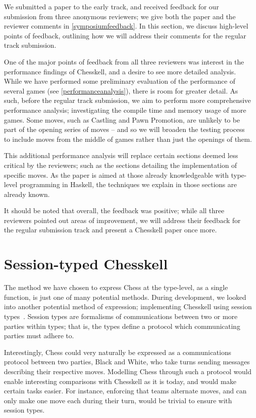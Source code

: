 We submitted a paper to the early track, and received feedback for our submission from three anonymous reviewers; we give both the paper and the reviewer comments in \cref{symposiumfeedback}. In this section, we discuss high-level points of feedback, outlining how we will address their comments for the regular track submission.

One of the major points of feedback from all three reviewers was interest in the performance findings of Chesskell, and a desire to see more detailed analysis. While we have performed some preliminary evaluation of the performance of several games (see \cref{performanceanalysis}), there is room for greater detail. As such, before the regular track submission, we aim to perform more comprehensive performance analysis; investigating the compile time and memory usage of more games. Some moves, such as Castling and Pawn Promotion, are unlikely to be part of the opening series of moves -- and so we will broaden the testing process to include moves from the middle of games rather than just the openings of them.

This additional performance analysis will replace certain sections deemed less critical by the reviewers; such as the sections detailing the implementation of specific moves. As the paper is aimed at those already knowledgeable with type-level programming in Haskell, the techniques we explain in those sections are already known.

It should be noted that overall, the feedback was positive; while all three reviewers pointed out areas of improvement, we will address their feedback for the regular submission track and present a Chesskell paper once more.

\section{Session-typed Chesskell}

The method we have chosen to express Chess at the type-level, as a single function, is just one of many potential methods. During development, we looked into another potential method of expression; implementing Chesskell using session types~\cite{torinosessions}. Session types are formalisms of communications between two or more parties within types; that is, the types define a protocol which communicating parties must adhere to.

Interestingly, Chess could very naturally be expressed as a communications protocol between two parties, Black and White, who take turns sending messages describing their respective moves. Modelling Chess through such a protocol would enable interesting comparisons with Chesskell as it is today, and would make certain tasks easier. For instance, enforcing that teams alternate moves, and can only make one move each during their turn, would be trivial to ensure with session types.

